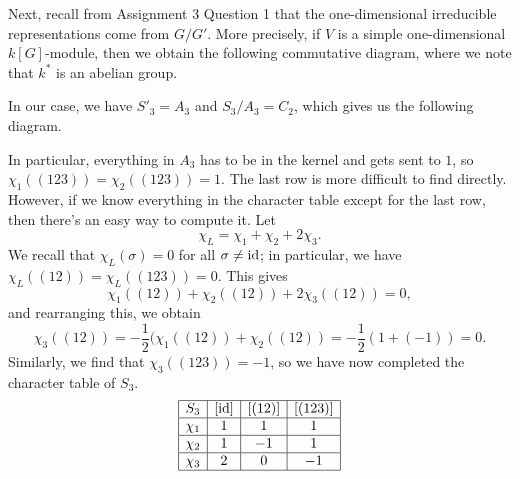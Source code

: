 \begin{exmp}{}
    Next, recall from Assignment 3 Question 1 that the one-dimensional 
    irreducible representations come from $G/G'$. More precisely, if 
    $V$ is a simple one-dimensional $k[G]$-module, then we obtain the following 
    commutative diagram, where we note that $k^*$ is an abelian group. 
    \begin{center}
    \end{center}
    In our case, we have $S'_3 = A_3$ and $S_3/A_3 = C_2$, which gives us 
    the following diagram. 
    \begin{center}
    \end{center}
    In particular, everything in $A_3$ has to be in the kernel and
    gets sent to $1$, so $\chi_1((123)) = \chi_2((123)) = 1$. 
    The last row is more difficult to find directly. However, if we know 
    everything in the character table except for the last row, then there's an 
    easy way to compute it. Let 
    \[ \chi_L = \chi_1 + \chi_2 + 2\chi_3. \] 
    We recall that $\chi_L(\sigma) = 0$ for all $\sigma \neq \operatorname{id}$; in particular, 
    we have $\chi_L((12)) = \chi_L((123)) = 0$. This gives 
    \[ \chi_1((12)) + \chi_2((12)) + 2\chi_3((12)) = 0, \] 
    and rearranging this, we obtain 
    \[ \chi_3((12)) = -\frac12(\chi_1((12)) + \chi_2((12)) 
    = -\frac12(1 + (-1)) = 0. \] 
    Similarly, we find that $\chi_3((123)) = -1$, so we have now completed the 
    character table of $S_3$. 
    \begin{align*}
        \begin{array}{|c|c|c|c|}
            \hline
            S_3    & [\operatorname{id}] & [(12)] & [(123)] \\ \hline
            \chi_1 & 1     & 1      & 1       \\ \hline
            \chi_2 & 1     & -1     & 1       \\ \hline
            \chi_3 & 2     & 0      & -1      \\ \hline
        \end{array} 
    \end{align*}
\end{exmp}

